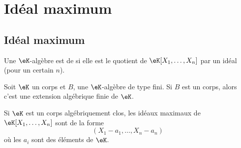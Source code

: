 \section{Idéal maximum}

\subsection{Idéal maximum}

\begin{definition}  \label{DefWHDdTrC}
	Une \( \eK\)-algèbre est de  si elle est le quotient de \( \eK[X_1,\ldots, X_n]\) par un idéal (pour un certain \( n\)).
\end{definition}

\begin{theorem}      \label{ThonoZyKa}
	Soit \( \eK\) un corps et \( B\), une \( \eK\)-algèbre de type fini. Si \( B\) est un corps, alors c'est une extension algébrique finie de \( \eK\).
\end{theorem}

\begin{theorem}  \label{ThowgZYqx}
	Si \( \eK\) est un corps algébriquement clos, les idéaux maximaux de \( \eK[X_1,\ldots, X_n]\) sont de la forme
	\begin{equation}
		(X_1-a_1,\ldots, X_n-a_n)
	\end{equation}
	où les \( a_i\) sont des éléments de \( \eK\).
\end{theorem}

